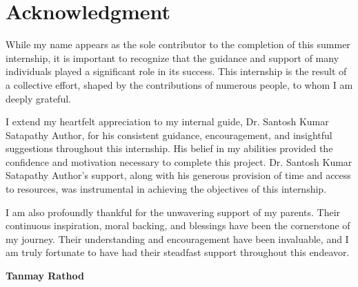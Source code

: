 \section*{\textcolor{internationalkleinblue}{\textbf{Acknowledgment}}}
 While my name appears as the sole contributor to the completion of this summer internship, it is important to recognize that the guidance and support of many individuals played a significant role in its success. This internship is the result of a collective effort, shaped by the contributions of numerous people, to whom I am deeply grateful.

 I extend my heartfelt appreciation to my internal guide, Dr. Santosh Kumar Satapathy
Author, for his consistent guidance, encouragement, and insightful suggestions throughout this internship. His belief in my abilities provided the confidence and motivation necessary to complete this project. Dr. Santosh Kumar Satapathy
Author’s support, along with his generous provision of time and access to resources, was instrumental in achieving the objectives of this internship.

 I am also profoundly thankful for the unwavering support of my parents. Their continuous inspiration, moral backing, and blessings have been the cornerstone of my journey. Their understanding and encouragement have been invaluable, and I am truly fortunate to have had their steadfast support throughout this endeavor.
\begin{flushright}
\textbf{Tanmay Rathod}\\
\end{flushright}

